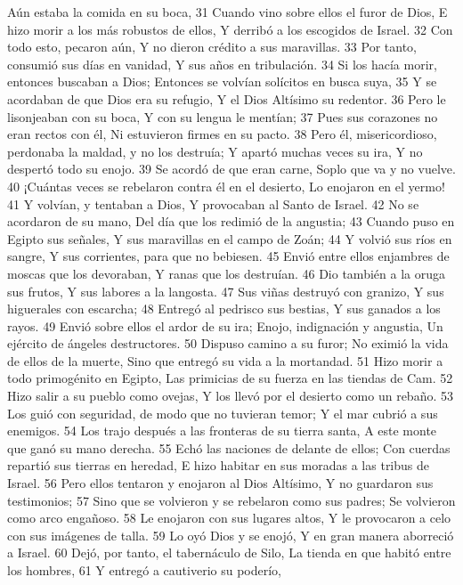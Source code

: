 Aún estaba la comida en su boca,
31 Cuando vino sobre ellos el furor de Dios,
E hizo morir a los más robustos de ellos,
Y derribó a los escogidos de Israel.
32 Con todo esto, pecaron aún,
Y no dieron crédito a sus maravillas.
33 Por tanto, consumió sus días en vanidad,
Y sus años en tribulación.
34 Si los hacía morir, entonces buscaban a Dios;
Entonces se volvían solícitos en busca suya,
35 Y se acordaban de que Dios era su refugio,
Y el Dios Altísimo su redentor.
36 Pero le lisonjeaban con su boca,
Y con su lengua le mentían;
37 Pues sus corazones no eran rectos con él,
Ni estuvieron firmes en su pacto.
38 Pero él, misericordioso, perdonaba la maldad, y no los destruía;
Y apartó muchas veces su ira,
Y no despertó todo su enojo.
39 Se acordó de que eran carne,
Soplo que va y no vuelve.
40 ¡Cuántas veces se rebelaron contra él en el desierto,
Lo enojaron en el yermo!
41 Y volvían, y tentaban a Dios,
Y provocaban al Santo de Israel.
42 No se acordaron de su mano,
Del día que los redimió de la angustia;
43 Cuando puso en Egipto sus señales,
Y sus maravillas en el campo de Zoán;
44 Y volvió sus ríos en sangre,
Y sus corrientes, para que no bebiesen.
45 Envió entre ellos enjambres de moscas  que los devoraban,
Y ranas que los destruían.
46 Dio también a la oruga sus frutos,
Y sus labores a la langosta.
47 Sus viñas destruyó con granizo,
Y sus higuerales con escarcha;
48 Entregó al pedrisco sus bestias,
Y sus ganados a los rayos.
49 Envió sobre ellos el ardor de su ira;
Enojo, indignación y angustia,
Un ejército de ángeles destructores.
50 Dispuso camino a su furor;
No eximió la vida de ellos de la muerte,
Sino que entregó su vida a la mortandad.
51 Hizo morir a todo primogénito en Egipto,
Las primicias de su fuerza en las tiendas de Cam.
52 Hizo salir a su pueblo como ovejas,
Y los llevó por el desierto como un rebaño.
53 Los guió con seguridad, de modo que no tuvieran temor;
Y el mar cubrió a sus enemigos.
54 Los trajo después a las fronteras de su tierra santa,
A este monte que ganó su mano derecha.
55 Echó las naciones de delante de ellos;
Con cuerdas repartió sus tierras en heredad,
E hizo habitar en sus moradas a las tribus de Israel.
56 Pero ellos tentaron y enojaron al Dios Altísimo,
Y no guardaron sus testimonios;
57 Sino que se volvieron y se rebelaron como sus padres;
Se volvieron como arco engañoso.
58 Le enojaron con sus lugares altos,
Y le provocaron a celo con sus imágenes de talla.
59 Lo oyó Dios y se enojó,
Y en gran manera aborreció a Israel.
60 Dejó, por tanto, el tabernáculo de Silo,
La tienda en que habitó entre los hombres,
61 Y entregó a cautiverio su poderío,
